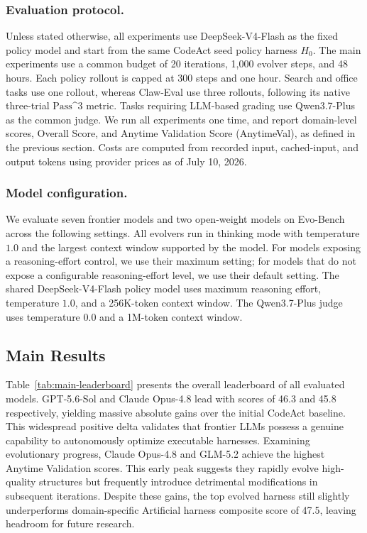 \subsubsection{Evaluation protocol.}
Unless stated otherwise, all experiments use DeepSeek-V4-Flash as the fixed policy model and start from the same CodeAct seed policy harness $H_0$. The main experiments use a common budget of 20 iterations, 1,000 evolver steps, and 48 hours. Each policy rollout is capped at 300 steps and one hour. Search and office tasks use one rollout, whereas Claw-Eval use three rollouts, following its native three-trial $\mathrm{Pass}$\^{}$3$ metric. Tasks requiring LLM-based grading use Qwen3.7-Plus as the common judge. We run all experiments one time, and report domain-level scores, Overall Score, and Anytime Validation Score (AnytimeVal), as defined in the previous section. Costs are computed from recorded input, cached-input, and output tokens using provider prices as of July 10, 2026.

\subsubsection{Model configuration.}
We evaluate seven frontier models and two open-weight models on Evo-Bench across the following settings. 
All evolvers run in thinking mode with temperature $1.0$ and the largest context window supported by the model. For models exposing a reasoning-effort control, we use their maximum setting; for models that do not expose a configurable reasoning-effort level, we use their default setting. The shared DeepSeek-V4-Flash policy model uses maximum reasoning effort, temperature $1.0$, and a 256K-token context window. The Qwen3.7-Plus judge uses temperature $0.0$ and a 1M-token context window. 

\subsection{Main Results}


Table~\ref{tab:main-leaderboard} presents the overall leaderboard of all evaluated models. GPT-5.6-Sol and Claude Opus-4.8 lead with scores of 46.3 and 45.8 respectively, yielding massive absolute gains over the initial CodeAct baseline. This widespread positive delta validates that frontier LLMs possess a genuine capability to autonomously optimize executable harnesses. Examining evolutionary progress, Claude Opus-4.8 and GLM-5.2 achieve the highest Anytime Validation scores. This early peak suggests they rapidly evolve high-quality structures but frequently introduce detrimental modifications in subsequent iterations. Despite these gains, the top evolved harness still slightly underperforms domain-specific Artificial harness composite score of 47.5, leaving headroom for future research.


